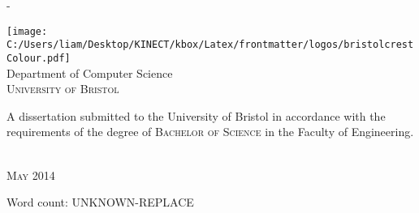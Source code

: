 \begin{titlingpage}
\begin{SingleSpace}
\begin{adjustwidth*}{\unitlength}{-\unitlength}
\begin{center}
\vspace{11mm}
\texttt{[image: C:/Users/liam/Desktop/KINECT/kbox/Latex/frontmatter/logos/bristolcrestColour.pdf]}\\
\vspace{6mm}
{\large Department of Computer Science\\
\textsc{University of Bristol}}\\
\vspace{11mm}
\begin{minipage}{10cm}
A dissertation submitted to the University of Bristol in accordance with the requirements of the degree of \textsc{Bachelor of Science} in the Faculty of Engineering.
\end{minipage}\\
\vspace{9mm}
{\large\textsc{May 2014}}
\vspace{12mm}
\end{center}
\begin{flushright}
{\small Word count: UNKNOWN-REPLACE}
\end{flushright}
\end{adjustwidth*}
\end{SingleSpace}
\end{titlingpage}
